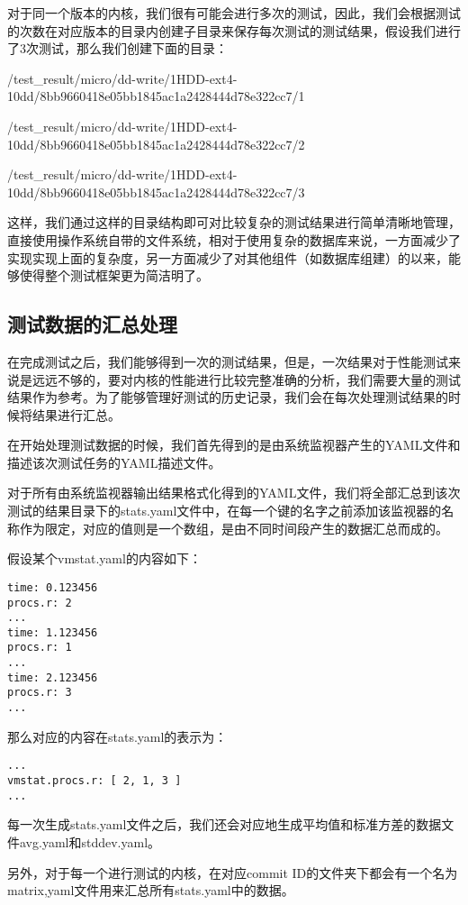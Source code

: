 对于同一个版本的内核，我们很有可能会进行多次的测试，因此，我们会根据测试的次数在对应版本的目录内创建子目录来保存每次测试的测试结果，假设我们进行了3次测试，那么我们创建下面的目录：

\begin{center}
\footnotesize
/test\_result/micro/dd-write/1HDD-ext4-10dd/8bb9660418e05bb1845ac1a2428444d78e322cc7/1

/test\_result/micro/dd-write/1HDD-ext4-10dd/8bb9660418e05bb1845ac1a2428444d78e322cc7/2

/test\_result/micro/dd-write/1HDD-ext4-10dd/8bb9660418e05bb1845ac1a2428444d78e322cc7/3
\end{center}

这样，我们通过这样的目录结构即可对比较复杂的测试结果进行简单清晰地管理，直接使用操作系统自带的文件系统，相对于使用复杂的数据库来说，一方面减少了实现实现上面的复杂度，另一方面减少了对其他组件（如数据库组建）的以来，能够使得整个测试框架更为简洁明了。

\subsection{测试数据的汇总处理}

在完成测试之后，我们能够得到一次的测试结果，但是，一次结果对于性能测试来说是远远不够的，要对内核的性能进行比较完整准确的分析，我们需要大量的测试结果作为参考。为了能够管理好测试的历史记录，我们会在每次处理测试结果的时候将结果进行汇总。

在开始处理测试数据的时候，我们首先得到的是由系统监视器产生的YAML文件和描述该次测试任务的YAML描述文件。

对于所有由系统监视器输出结果格式化得到的YAML文件，我们将全部汇总到该次测试的结果目录下的stats.yaml文件中，在每一个键的名字之前添加该监视器的名称作为限定，对应的值则是一个数组，是由不同时间段产生的数据汇总而成的。

假设某个vmstat.yaml的内容如下：
\begin{verbatim}
time: 0.123456
procs.r: 2
...
time: 1.123456
procs.r: 1
...
time: 2.123456
procs.r: 3
...
\end{verbatim}
那么对应的内容在stats.yaml的表示为：
\begin{verbatim}
...
vmstat.procs.r: [ 2, 1, 3 ]
...
\end{verbatim}
每一次生成stats.yaml文件之后，我们还会对应地生成平均值和标准方差的数据文件avg.yaml和stddev.yaml。

另外，对于每一个进行测试的内核，在对应commit ID的文件夹下都会有一个名为matrix,yaml文件用来汇总所有stats.yaml中的数据。

